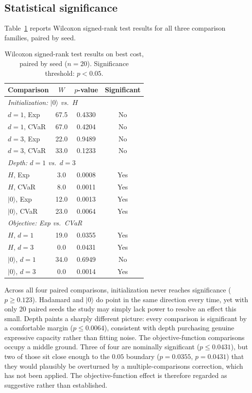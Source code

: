 \documentclass[runningheads]{llncs}
\begin{document}
\subsection{Statistical significance}
\label{sec:stats}
Table~\ref{tab:wilcoxon} reports Wilcoxon signed-rank test results for all three comparison families, paired by seed.

\begin{table}[h!]
\caption{Wilcoxon signed-rank test results on best cost, paired by seed ($n = 20$). Significance threshold: $p < 0.05$.}
\label{tab:wilcoxon}
\centering
\small
\setlength{\tabcolsep}{4pt}
\begin{tabular}{lccc}
\hline
\textbf{Comparison} & \textbf{$W$} & \textbf{$p$-value} & \textbf{Significant} \\
\hline
\multicolumn{4}{l}{\textit{Initialization: $|0\rangle$ vs.\ $H$}} \\
$d=1$, Exp  & 67.5 & 0.4330 & No \\
$d=1$, CVaR & 67.0 & 0.4204 & No \\
$d=3$, Exp  & 22.0 & 0.9489 & No \\
$d=3$, CVaR & 33.0 & 0.1233 & No \\
\hline
\multicolumn{4}{l}{\textit{Depth: $d=1$ vs.\ $d=3$}} \\
$H$, Exp           & 3.0  & 0.0008 & Yes \\
$H$, CVaR          & 8.0  & 0.0011 & Yes \\
$|0\rangle$, Exp   & 12.0 & 0.0013 & Yes \\
$|0\rangle$, CVaR  & 23.0 & 0.0064 & Yes \\
\hline
\multicolumn{4}{l}{\textit{Objective: Exp vs.\ CVaR}} \\
$H$, $d=1$         & 19.0 & 0.0355 & Yes \\
$H$, $d=3$         & 0.0  & 0.0431 & Yes \\
$|0\rangle$, $d=1$ & 34.0 & 0.6949 & No \\
$|0\rangle$, $d=3$ & 0.0  & 0.0014 & Yes \\
\hline
\end{tabular}
\end{table}

Across all four paired comparisons, initialization never reaches significance ($p \geq 0.123$). Hadamard and $|0\rangle$ do point in the same direction every time, yet with only 20 paired seeds the study may simply lack power to resolve an effect this small. Depth paints a sharply different picture: every comparison is significant by a comfortable margin ($p \leq 0.0064$), consistent with depth purchasing genuine expressive capacity rather than fitting noise. The objective-function comparisons occupy a middle ground. Three of four are nominally significant ($p \leq 0.0431$), but two of those sit close enough to the $0.05$ boundary ($p = 0.0355$, $p = 0.0431$) that they would plausibly be overturned by a multiple-comparisons correction, which has not been applied. The objective-function effect is therefore regarded as suggestive rather than established.
\end{document}
